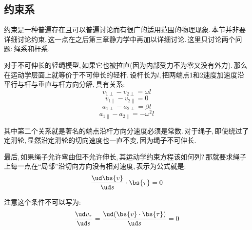 \subsection{约束系}
约束是一种普遍存在且可以普遍讨论而有很广的适用范围的物理现象.\,本节并非要详细讨论约束,\,这一点在之后第三章静力学中再加以详细讨论.\,这里只讨论两个问题:\,绳系和杆系.

对于不可伸长的轻绳模型,\,如果它也被拉直(因为内部受力不为零又没有外力).\,那么在运动学层面上就等价于不可伸长的轻杆.\,设杆长为$l$,\,把两端点1和2速度加速度沿平行与杆与垂直与杆方向分解,\,具有关系:
\[v_{1\perp}-v_{2\perp}=\omega l\]
\[v_{1\parallel}-v_{2\parallel}=0\]
\[a_{1\perp}-a_{2\perp}=\beta l\]
\[a_{1\parallel}-a_{2\parallel}=-\omega^2 l\]

其中第二个关系就是著名的端点沿杆方向分速度必须是常数.\,对于绳子,\,即使绕过了定滑轮,\,显然沿定滑轮的切向速度也一直不变,\,因为绳子不可伸长.

最后,\,如果绳子允许弯曲但不允许伸长,\,其运动学约束方程该如何列?\,那就要求绳子上每一点在``局部''沿切向方向没有相对速度,\,表示为公式就是:
\[\frac{\ud \bs{v}}{\ud s}\cdot\bs{\tau}=0\]

注意这个条件不可以写为:
\[\frac{\ud v_\tau}{\ud s}=\frac{\ud (\bs{v}\cdot\bs{\tau})}{\ud s}=0\]
